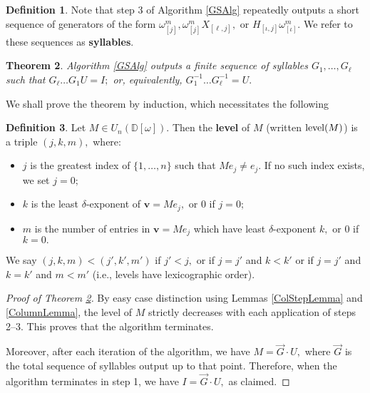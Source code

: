 \documentclass{dalthesis}
\theoremstyle{theorem}
\newtheorem{theorem}{Theorem}
\theoremstyle{definition}
\newtheorem{definition}[theorem]{Definition}
\theoremstyle{definition}  %
\theoremstyle{definition}
\newcommand{\D}{\mathbb{D}}
\newcommand{\jay}{j}
\newcommand{\kay}{k}
\renewcommand{\:}{\mathbin{:}}
\newcommand{\level}{\mathop{\rm level}\nolimits}
\renewcommand{\vec}{\overrightarrow}
\begin{document}
\begin{definition}
\label{SyllableDef}
Note that step 3 of Algorithm \ref{GSAlg} repeatedly outputs a short sequence of generators of the form $\omega^m_{[\jay]}, \omega^m_{[\jay]}X_{[\ell,\jay]},$ or $H_{[\iota,\jay]}\omega^m_{[\iota]}.$ We refer to these sequences as \textbf{syllables}.
\end{definition}

\begin{theorem}
\label{AlgTermThm}
Algorithm \ref{GSAlg} outputs a finite sequence of syllables $G_1,\ldots ,G_\ell$ such that $G_\ell\ldots G_1 U = I;$ or, equivalently, $G_1^{-1}\ldots G_\ell^{-1} = U.$
\end{theorem}

We shall prove the theorem by induction, which necessitates the following 

\begin{definition}
\label{LevelDef}
Let $M\in U_n(\D[\omega])$. Then the \textbf{level} of $M$ (written $\level(M)$) is a triple $(\jay,\kay,m),$ where:

\begin{itemize}
\item $\jay$ is the greatest index of $\{1,\ldots ,n\}$ such that $Me_{\jay}\neq e_{\jay}.$ If no such index exists, we set $\jay=0;$
\item $\kay$ is the least $\delta$-exponent of $\boldsymbol{v} = Me_{\jay},$ or $0$ if $\jay = 0;$
\item $m$ is the number of entries in $\boldsymbol{v} = Me_{\jay}$ which have least $\delta$-exponent $\kay,$ or $0$ if $\kay = 0.$
\end{itemize}

We say $(\jay,\kay,m) < (\jay',\kay',m')$ if $\jay'<\jay,$ or if $\jay = \jay'$ and $\kay < \kay'$ or if $\jay=\jay'$ and $\kay = \kay'$ and $m < m'$ (i.e., levels have lexicographic order).
\end{definition}

\begin{proof}[Proof of Theorem \ref{AlgTermThm}]
By easy case distinction using Lemmas \ref{ColStepLemma} and \ref{ColumnLemma}, the level of $M$ strictly decreases with each application of steps 2--3. This proves that the algorithm terminates. 

Moreover, after each iteration of the algorithm, we have $M=\vec{G}\cdot U,$ where $\vec{G}$ is the total sequence of syllables output up to that point. Therefore, when the algorithm terminates in step 1, we have $I = \vec{G}\cdot U,$ as claimed.
\end{proof}
\end{document}
